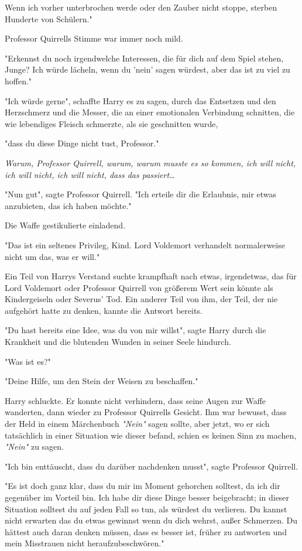 {Wenn ich vorher unterbrochen werde oder den Zauber nicht stoppe, sterben Hunderte von Schülern."

Professor Quirrells Stimme war immer noch mild.

"Erkennst du noch irgendwelche Interessen, die für dich auf dem Spiel stehen, Junge? Ich würde lächeln, wenn du 'nein' sagen würdest, aber das ist zu viel zu hoffen."

"Ich würde gerne", schaffte Harry es zu sagen, durch das Entsetzen und den Herzschmerz und die Messer, die an einer emotionalen Verbindung schnitten, die wie lebendiges Fleisch schmerzte, als sie geschnitten wurde,

"dass du diese Dinge nicht tust, Professor."

\emph{Warum, Professor Quirrell, warum, warum musste es so kommen, ich will nicht, ich will nicht, ich will nicht, dass das passiert…}

"Nun gut", sagte Professor Quirrell. "Ich erteile dir die Erlaubnis, mir etwas anzubieten, das ich haben möchte."

Die Waffe gestikulierte einladend.

"Das ist ein seltenes Privileg, Kind. Lord Voldemort verhandelt normalerweise nicht um das, was er will."

Ein Teil von Harrys Verstand suchte krampfhaft nach etwas, irgendetwas, das für Lord Voldemort oder Professor Quirrell von größerem Wert sein könnte als Kindergeiseln oder Severus' Tod. Ein anderer Teil von ihm, der Teil, der nie aufgehört hatte zu denken, kannte die Antwort bereits.

"Du hast bereits eine Idee, was du von mir willst", sagte Harry durch die Krankheit und die blutenden Wunden in seiner Seele hindurch.

"Was ist es?"

"Deine Hilfe, um den Stein der Weisen zu beschaffen."

Harry schluckte. Er konnte nicht verhindern, dass seine Augen zur Waffe wanderten, dann wieder zu Professor Quirrells Gesicht. Ihm war bewusst, dass der Held in einem Märchenbuch \emph{"Nein"} sagen sollte, aber jetzt, wo er sich tatsächlich in einer Situation wie dieser befand, schien es keinen Sinn zu machen, \emph{"Nein"} zu sagen.

"Ich bin enttäuscht, dass du darüber nachdenken musst", sagte Professor Quirrell.

"Es ist doch ganz klar, dass du mir im Moment gehorchen solltest, da ich dir gegenüber im Vorteil bin. Ich habe dir diese Dinge besser beigebracht; in dieser Situation solltest du auf jeden Fall so tun, als würdest du verlieren. Du kannst nicht erwarten das du etwas gewinnst wenn du dich wehrst, außer Schmerzen. Du hättest auch daran denken müssen, dass es besser ist, früher zu antworten und mein Misstrauen nicht heraufzubeschwören."

}
